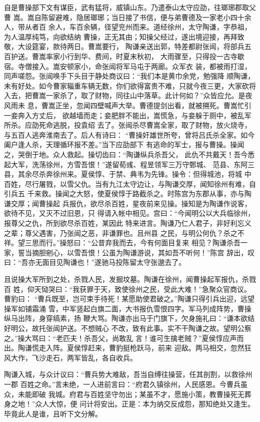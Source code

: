 自是曹操部下文有谋臣，武有猛将，威镇山东。乃遣泰山太守应劭，往瑯琊郡取父曹
嵩。嵩自陈留避难，隐居瑯琊；当日接了书信，便与弟曹德及一家老小四十余人，带从者百
余人，车百余辆，径望兖州而来。道经徐州，太守陶谦，字恭祖，为人温厚纯笃，向欲结纳
曹操，正无其由；知操父经过，遂出境迎接，再拜致敬，大设筵宴，款待两日。曹嵩要行，
陶谦亲送出郭，特差都尉张闿，将部兵五百护送。曹嵩率家小行到华、费间，时夏末秋初，
大雨骤至，只得投一古寺歇宿。寺僧接入。嵩安顿家小，命张闿将军马屯于两廊。众军衣
装，都被雨打湿，同声嗟怨。张闿唤手下头目于静处商议曰：“我们本是黄巾余党，勉强降
顺陶谦，未有好处。如今曹家辎重车辆无数，你们欲得富贵不难，只就今夜三更，大家砍将
入去，把曹嵩一家杀了，取了财物，同往山中落草。此计何如？”众皆应允。是夜风雨未
息，曹嵩正坐，忽闻四壁喊声大举。曹德提剑出看，就被搠死。曹嵩忙引一妾奔入方丈后，
欲越墙而走；妾肥胖不能出，嵩慌急，与妾躲于厕中，被乱军所杀。应劭死命逃脱，投袁绍
去了。张闿杀尽曹嵩全家，取了财物，放火烧寺，与五百人逃奔淮南去了。后人有诗曰：
“曹操奸雄世所夸，曾将吕氏杀全家。如今阖户逢人杀，天理循环报不差。”当下应劭部下
有逃命的军士，报与曹操。操闻之，哭倒于地。众人救起。操切齿曰：“陶谦纵兵杀吾父，
此仇不共戴天！吾今悉起大军，洗荡徐州，方雪吾恨！”遂留荀彧、程昱领军三万守鄄城、
范县、东阿三县，其余尽杀奔徐州来。夏侯惇、于禁、典韦为先锋。操令：但得城池，将城
中百姓，尽行屠戮，以雪父仇。当有九江太守边让，与陶谦交厚，闻知徐州有难，自引兵五
千来救。操闻之大怒，使夏侯惇于路截杀之。时陈宫为东郡从事，亦与陶谦交厚；闻曹操起
兵报仇，欲尽杀百姓，星夜前来见操。操知是为陶谦作说客，欲待不见，又灭不过旧恩，只
得请入帐中相见。宫曰：“今闻明公以大兵临徐州，报尊父之仇，所到欲尽杀百姓，某因此
特来进言。陶谦乃仁人君子，非好利忘义之辈；尊父遇害，乃张闿之恶，非谦罪也。且州县
之民，与明公何仇？杀之不祥。望三思而行。”操怒曰：“公昔弃我而去，今有何面目复来
相见？陶谦杀吾一家，誓当摘胆剜心，以雪吾恨！公虽为陶谦游说，其如吾不听何！”陈宫
辞出，叹曰：“吾亦无面目见陶谦也！”遂驰马投陈留太守张邈去了。

且说操大军所到之处，杀戮人民，发掘坟墓。陶谦在徐州，闻曹操起军报仇，杀戮百
姓，仰天恸哭曰：“我获罪于天，致使徐州之民，受此大难！”急聚众官商议。曹豹曰：
“曹兵既至，岂可束手待死！某愿助使君破之。”陶谦只得引兵出迎，远望操军如铺霜涌
雪，中军竖起白旗二面，大书报仇雪恨四字。军马列成阵势，曹操纵马出阵，身穿缟素，扬
鞭大骂。陶谦亦出马于门旗下，欠身施礼曰：“谦本欲结好明公，故托张闿护送。不想贼心
不改，致有此事。实不干陶谦之故。望明公察之。”操大骂曰：“老匹夫！杀吾父，尚敢乱
言！谁可生擒老贼？”夏侯惇应声而出。陶谦慌走入阵。夏侯惇赶来，曹豹挺枪跃马，前来
迎敌。两马相交，忽然狂风大作，飞沙走石，两军皆乱，各自收兵。

陶谦入城，与众计议曰：“曹兵势大难敌，吾当自缚往操营，任其剖割，以救徐州一郡
百姓之命。”言未绝，一人进前言曰：“府君久镇徐州，人民感恩。今曹兵虽众，未能即破
我城。府君与百姓坚守勿出；某虽不才，愿施小策，教曹操死无葬身之地！”众人大惊，便
问计将安出。正是：本为纳交反成怨，那知绝处又逢生。毕竟此人是谁，且听下文分解。